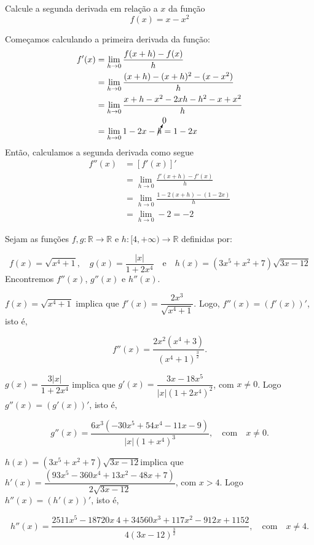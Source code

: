 \cleardoublepage\documentclass[../main.tex]{subfiles}
\begin{document}
\begin{exeresol}
  Calcule a segunda derivada em relação a $x$ da função
  \begin{equation*}
    f(x) = x - x^2
  \end{equation*}
\end{exeresol}
\begin{resol}
  Começamos calculando a primeira derivada da função:
  \begin{align*}
    f'(x) &= \lim_{h\to 0} \frac{f(x+h)-f(x)}{h} \\
          &= \lim_{h\to 0} \frac{(x+h)-(x+h)^2-(x-x^2)}{h} \\
          &= \lim_{h\to 0} \frac{x+h-x^2-2xh-h^2-x+x^2}{h} \\
          &= \lim_{h\to 0} 1-2x-\cancelto{0}{h} = 1 - 2x
  \end{align*}
  Então, calculamos a segunda derivada como segue
  \begin{align*}
    f''(x) &= [f'(x)]' \\
           &= \lim_{h\to 0} \frac{f'(x+h)-f'(x)}{h} \\
           &= \lim_{h\to 0} \frac{1-2(x+h)-(1-2x)}{h} \\
           &= \lim_{h\to 0} -2 = -2
  \end{align*}
\end{resol}
\begin{exeresol}
  Sejam as funções \(f,g:\mathbb{R}\to \mathbb{R}\) e \( h:[4, +\infty)\to \mathbb{R}\) definidas por:

\[ f(x)=\sqrt{x^4+1},\quad g(x)=\dfrac{|x|}{1+2x^4}\quad \mbox{e}\quad h(x)=(3x^5+x^2+7)\sqrt{3x-12} \]
Encontremos \(f''(x)\), \(g''(x)\) e \(h''(x)\).

\begin{resol}
    \begin{compactenum}[a.]
  \item \(f(x)=\sqrt{x^4+1}\) implica que \(f'(x)=\dfrac{2x^3}{\sqrt{x^4+1}}\). Logo, \(f''(x)=(f'(x))'\), isto é,

\[ f''(x)=\dfrac{2x^2(x^4+3)}{(x^4+1)^{\frac{3}{2}}}. \]
\item \(g(x)=\dfrac{3 |x|}{1+2x^4}\) implica que \(g'(x)=\dfrac{3x-18x^5}{|x|(1+2x^4)^2}\), com \(x\neq 0\). Logo \(g''(x)=(g'(x))'\), isto é,

\[ g''(x)=\dfrac{6x^3(-30x^5+54x^4-11x-9)}{|x|(1+x^4)^{3}},\quad \mbox{com}\quad x\neq 0. \]
\item \(h(x)=(3x^5+x^2+7)\sqrt{3x-12}\)\quad implica que \(h'(x)=\dfrac{(93x^5-360x^4+13x^2-48x+7)}{2\sqrt{3x-12}}\), com \(x> 4\). Logo \(h''(x)=(h'(x))'\), isto é,

\[ h''(x)=\dfrac{2511x^5-18720x~4+34560x^3+117x^2-912x+1152}{4(3x-12)^{\frac{3}{2}}},\quad \mbox{com}\quad x\neq 4. \]
\end{compactenum}
\end{resol}
\end{exeresol}
\end{document}
